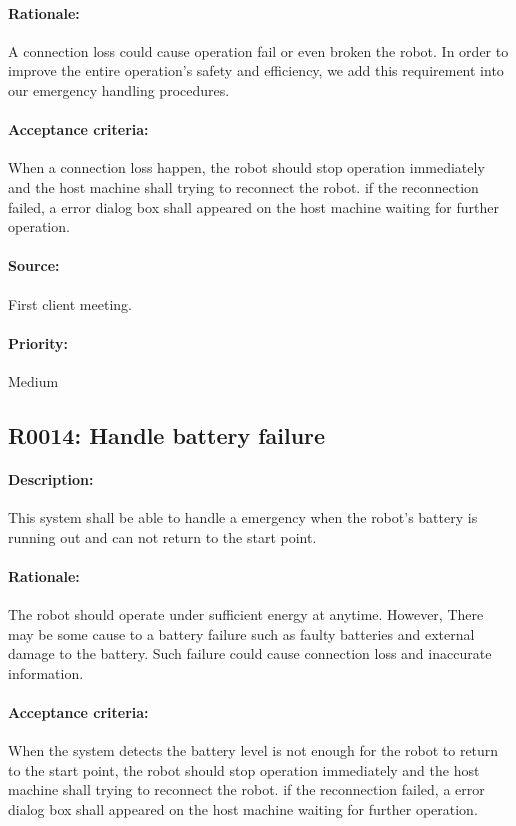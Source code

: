 \documentclass[11pt, a4paper]{report}
\begin{document}
\paragraph{Rationale:}
A connection loss could cause operation fail or even broken the robot. In order to improve the entire operation's safety and efficiency, we add this requirement into our emergency handling procedures. 
\paragraph{Acceptance criteria:}
When a connection loss happen, the robot should stop operation immediately and the host machine shall trying to reconnect the robot. if the reconnection failed, a error dialog box shall appeared on the host machine waiting for further operation.
\paragraph{Source:}
First client meeting.
\paragraph{Priority:}
Medium


\subsection{R0014: Handle battery failure}
\paragraph{Description:}
This system shall be able to handle a emergency when the robot's battery is running out and can not return to the start point.
\paragraph{Rationale:}
The robot should operate under sufficient energy at anytime. However, There may be some cause to a battery failure such as faulty batteries and external damage to the battery. Such failure could cause connection loss and inaccurate information. 
\paragraph{Acceptance criteria:}
When the system detects the battery level is not enough for the robot to return to the start point, the robot should stop operation immediately and the host machine shall trying to reconnect the robot. if the reconnection failed, a error dialog box shall appeared on the host machine waiting for further operation.
\end{document}
